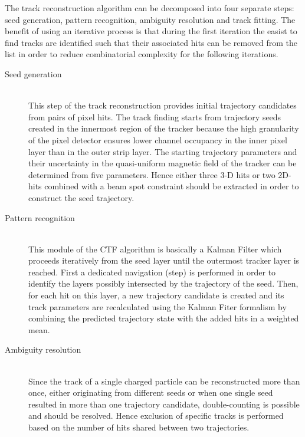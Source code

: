 The track reconstruction algorithm can be decomposed into four separate steps: seed generation, pattern recognition, ambiguity resolution and track fitting.
The benefit of using an iterative process is that during the first iteration the easist to find tracks are identified such that their associated hits can be removed from the list in order to reduce combinatorial complexity for the following iterations.

\begin{myindentpar}
  \begin{description}
    \item[Seed generation] \hfill \\
    This step of the track reconstruction provides initial trajectory candidates from pairs of pixel hits. The track finding starts from trajectory seeds created in the innermost region of the tracker because the high granularity of the pixel detector ensures lower channel occupancy in the inner pixel layer than in the outer strip layer. 
    The starting trajectory parameters and their uncertainty in the quasi-uniform magnetic field of the tracker can be determined from five parameters. Hence either three 3-D hits or two 2D-hits combined with a beam spot constraint should be extracted in order to construct the seed trajectory.
    \item[Pattern recognition] \hfill \\
    This module of the CTF algorithm is basically a Kalman Filter which proceeds iteratively from the seed layer until the outermost tracker layer is reached. %
    First a dedicated navigation (step) is performed in order to identify the layers possibly intersected by the trajectory of the seed. Then, for each hit on this layer, a new trajectory candidate is created and its track parameters are recalculated using the Kalman Fiter formalism by combining the predicted trajectory state with the added hits in a weighted mean.
    \item[Ambiguity resolution] \hfill \\
    Since the track of a single charged particle can be reconstructed more than once, either originating from different seeds or when one single seed resulted in more than one trajectory candidate, double-counting is possible and should be resolved. Hence exclusion of specific tracks is performed based on the number of hits shared between two trajectories. 

\end{description}
\end{myindentpar}
